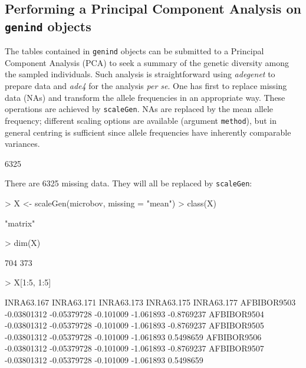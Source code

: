 \documentclass{article}
\begin{document}
\subsection{Performing a Principal Component Analysis on \texttt{genind} objects}
The tables contained in \texttt{genind} objects can be submitted to a Principal Component Analysis
(PCA) to seek a summary of the genetic diversity among the sampled individuals.
Such analysis is straightforward using \textit{adegenet} to prepare data and \textit{ade4} for the analysis \textit{per se}.
One has first to replace missing data (NAs) and transform the allele frequencies in an appropriate way.
These operations are achieved by \texttt{scaleGen}.
NAs are replaced by the mean allele frequency; different scaling options are available (argument
\texttt{method}), but in general centring is sufficient since allele frequencies have inherently
comparable variances.
\begin{Schunk}
\begin{Soutput}
[1] 6325
\end{Soutput}
\end{Schunk}
There are 6325 missing data. They will all be replaced by \texttt{scaleGen}:
\begin{Schunk}
\begin{Sinput}
> X <- scaleGen(microbov, missing = "mean")
> class(X)
\end{Sinput}
\begin{Soutput}
[1] "matrix"
\end{Soutput}
\begin{Sinput}
> dim(X)
\end{Sinput}
\begin{Soutput}
[1] 704 373
\end{Soutput}
\begin{Sinput}
> X[1:5, 1:5]
\end{Sinput}
\begin{Soutput}
             INRA63.167  INRA63.171 INRA63.173 INRA63.175 INRA63.177
AFBIBOR9503 -0.03801312 -0.05379728  -0.101009  -1.061893 -0.8769237
AFBIBOR9504 -0.03801312 -0.05379728  -0.101009  -1.061893 -0.8769237
AFBIBOR9505 -0.03801312 -0.05379728  -0.101009  -1.061893  0.5498659
AFBIBOR9506 -0.03801312 -0.05379728  -0.101009  -1.061893 -0.8769237
AFBIBOR9507 -0.03801312 -0.05379728  -0.101009  -1.061893  0.5498659
\end{Soutput}
\end{Schunk}
\end{document}
